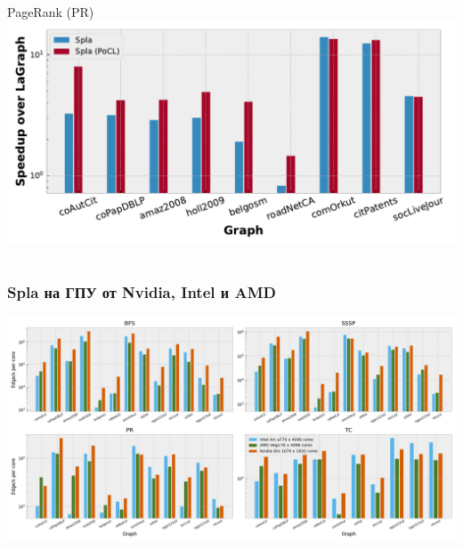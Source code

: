 \documentclass[xcolor=table,aspectratio=169]{beamer}
\begin{document}
\begin{frame}
\begin{columns}
\begin{center}
        PageRank (PR) \\
        \includegraphics[width=0.9\linewidth]{pictures/rq1_rel_pr.pdf}
        \end{center}
    \end{columns}
    
\end{frame}

\begin{frame}
  \frametitle{Spla на ГПУ от Nvidia, Intel и AMD}
  \begin{center}
    \includegraphics[width=0.95\linewidth]{pictures/rq2_cores.png}
  \end{center}
\end{frame}
\end{document}
